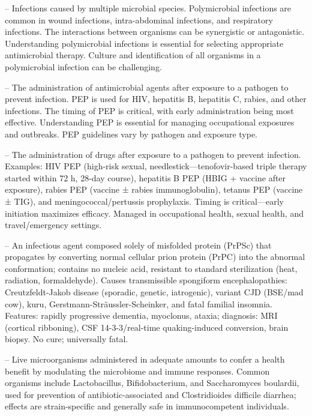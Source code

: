 -- Infections caused by multiple microbial species. Polymicrobial infections are common in wound infections, intra-abdominal infections, and respiratory infections. The interactions between organisms can be synergistic or antagonistic. Understanding polymicrobial infections is essential for selecting appropriate antimicrobial therapy. Culture and identification of all organisms in a polymicrobial infection can be challenging.

-- The administration of antimicrobial agents after exposure to a pathogen to prevent infection. PEP is used for HIV, hepatitis B, hepatitis C, rabies, and other infections. The timing of PEP is critical, with early administration being most effective. Understanding PEP is essential for managing occupational exposures and outbreaks. PEP guidelines vary by pathogen and exposure type.

-- The administration of drugs after exposure to a pathogen to prevent infection. Examples: HIV PEP (high-risk sexual, needlestick—tenofovir-based triple therapy started within 72 h, 28-day course), hepatitis B PEP (HBIG + vaccine after exposure), rabies PEP (vaccine ± rabies immunoglobulin), tetanus PEP (vaccine ± TIG), and meningococcal/pertussis prophylaxis. Timing is critical—early initiation maximizes efficacy. Managed in occupational health, sexual health, and travel/emergency settings.

-- An infectious agent composed solely of misfolded protein (PrPSc) that propagates by converting normal cellular prion protein (PrPC) into the abnormal conformation; contains no nucleic acid, resistant to standard sterilization (heat, radiation, formaldehyde). Causes transmissible spongiform encephalopathies: Creutzfeldt-Jakob disease (sporadic, genetic, iatrogenic), variant CJD (BSE/mad cow), kuru, Gerstmann-Sträussler-Scheinker, and fatal familial insomnia. Features: rapidly progressive dementia, myoclonus, ataxia; diagnosis: MRI (cortical ribboning), CSF 14-3-3/real-time quaking-induced conversion, brain biopsy. No cure; universally fatal.

-- Live microorganisms administered in adequate amounts to confer a health benefit by modulating the microbiome and immune responses. Common organisms include Lactobacillus, Bifidobacterium, and Saccharomyces boulardii, used for prevention of antibiotic-associated and Clostridioides difficile diarrhea; effects are strain-specific and generally safe in immunocompetent individuals.

